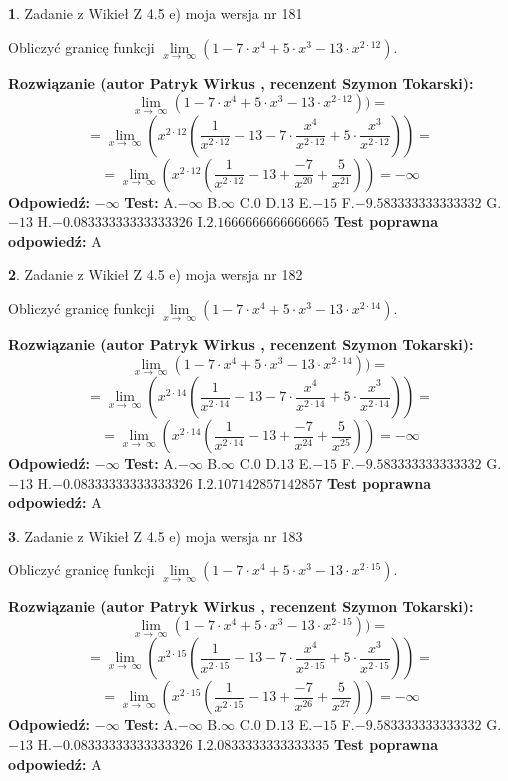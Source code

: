 \documentclass[12pt, a4paper]{article}
\theoremstyle{definition} %
\newtheorem{zad}{}
\newcommand{\zadStart}[1]{\begin{zad}#1\newline}
\newcommand{\zadStop}{\end{zad}}
\newcommand{\rozwStart}[2]{\noindent \textbf{Rozwiązanie (autor #1 , recenzent #2): }\newline}
\newcommand{\rozwStop}{\newline}
\newcommand{\odpStart}{\noindent \textbf{Odpowiedź:}\newline}
\newcommand{\odpStop}{\newline}
\newcommand{\testStart}{\noindent \textbf{Test:}\newline}
\newcommand{\testStop}{\newline}
\newcommand{\kluczStart}{\noindent \textbf{Test poprawna odpowiedź:}\newline}
\newcommand{\kluczStop}{\newline}
\begin{document}
\zadStart{Zadanie z Wikieł Z 4.5 e) moja wersja nr 181}


Obliczyć granicę funkcji  $\lim\limits_{x\to\ \infty}(1 - 7 \cdot x^{4}+5 \cdot x^{3}- 13 \cdot x^{2\cdot12})$.
\zadStop
\rozwStart{Patryk Wirkus}{Szymon Tokarski}
$$\lim\limits_{x\to\ \infty}(1 - 7 \cdot x^{4}+5 \cdot x^{3}- 13 \cdot x^{2\cdot12}))=$$
$$=\lim\limits_{x\to\ \infty}(x^{2\cdot12}(\frac{1}{x^{2\cdot12}}-13 -7 \cdot \frac{x^{4}}{x^{2\cdot12}}+5 \cdot \frac{x^{3}}{x^{2\cdot12}}))=$$
$$=\lim\limits_{x\to\ \infty}(x^{2\cdot12}(\frac{1}{x^{2\cdot12}}-13 + \frac{-7}{x^{20}}+ \frac{5}{x^{21}}))=-\infty$$
\rozwStop
\odpStart
$-\infty$
\odpStop
\testStart
A.$-\infty$ B.$\infty$ C.$0$ D.$13$ E.$-15$
F.$-9.583333333333332$ G.$-13$
H.$-0.08333333333333326$
I.$2.1666666666666665$
\testStop
\kluczStart
A
\kluczStop



\zadStart{Zadanie z Wikieł Z 4.5 e) moja wersja nr 182}


Obliczyć granicę funkcji  $\lim\limits_{x\to\ \infty}(1 - 7 \cdot x^{4}+5 \cdot x^{3}- 13 \cdot x^{2\cdot14})$.
\zadStop
\rozwStart{Patryk Wirkus}{Szymon Tokarski}
$$\lim\limits_{x\to\ \infty}(1 - 7 \cdot x^{4}+5 \cdot x^{3}- 13 \cdot x^{2\cdot14}))=$$
$$=\lim\limits_{x\to\ \infty}(x^{2\cdot14}(\frac{1}{x^{2\cdot14}}-13 -7 \cdot \frac{x^{4}}{x^{2\cdot14}}+5 \cdot \frac{x^{3}}{x^{2\cdot14}}))=$$
$$=\lim\limits_{x\to\ \infty}(x^{2\cdot14}(\frac{1}{x^{2\cdot14}}-13 + \frac{-7}{x^{24}}+ \frac{5}{x^{25}}))=-\infty$$
\rozwStop
\odpStart
$-\infty$
\odpStop
\testStart
A.$-\infty$ B.$\infty$ C.$0$ D.$13$ E.$-15$
F.$-9.583333333333332$ G.$-13$
H.$-0.08333333333333326$
I.$2.107142857142857$
\testStop
\kluczStart
A
\kluczStop



\zadStart{Zadanie z Wikieł Z 4.5 e) moja wersja nr 183}


Obliczyć granicę funkcji  $\lim\limits_{x\to\ \infty}(1 - 7 \cdot x^{4}+5 \cdot x^{3}- 13 \cdot x^{2\cdot15})$.
\zadStop
\rozwStart{Patryk Wirkus}{Szymon Tokarski}
$$\lim\limits_{x\to\ \infty}(1 - 7 \cdot x^{4}+5 \cdot x^{3}- 13 \cdot x^{2\cdot15}))=$$
$$=\lim\limits_{x\to\ \infty}(x^{2\cdot15}(\frac{1}{x^{2\cdot15}}-13 -7 \cdot \frac{x^{4}}{x^{2\cdot15}}+5 \cdot \frac{x^{3}}{x^{2\cdot15}}))=$$
$$=\lim\limits_{x\to\ \infty}(x^{2\cdot15}(\frac{1}{x^{2\cdot15}}-13 + \frac{-7}{x^{26}}+ \frac{5}{x^{27}}))=-\infty$$
\rozwStop
\odpStart
$-\infty$
\odpStop
\testStart
A.$-\infty$ B.$\infty$ C.$0$ D.$13$ E.$-15$
F.$-9.583333333333332$ G.$-13$
H.$-0.08333333333333326$
I.$2.0833333333333335$
\testStop
\kluczStart
A
\kluczStop
\end{document}
